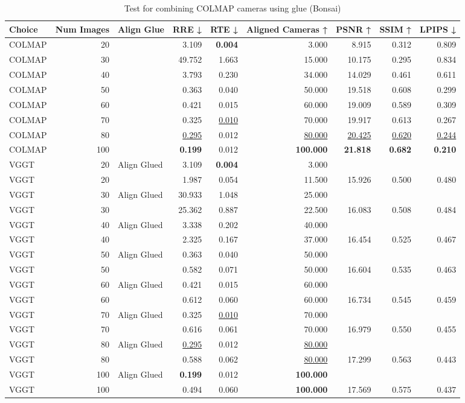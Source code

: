 \begin{table}[H]
\caption{Test for combining COLMAP cameras using glue (Bonsai)}
\label{tab:99_align_glue_bonsai}
\begin{tabular}{lrlrrrrrr}
\toprule
Choice & Num Images & Align Glue & RRE ↓ & RTE ↓ & Aligned Cameras ↑ & PSNR ↑ & SSIM ↑ & LPIPS ↓ \\
\midrule
COLMAP & 20 &  & 3.109 & \textbf{0.004} & 3.000 & 8.915 & 0.312 & 0.809 \\
COLMAP & 30 &  & 49.752 & 1.663 & 15.000 & 10.175 & 0.295 & 0.834 \\
COLMAP & 40 &  & 3.793 & 0.230 & 34.000 & 14.029 & 0.461 & 0.611 \\
COLMAP & 50 &  & 0.363 & 0.040 & 50.000 & 19.518 & 0.608 & 0.299 \\
COLMAP & 60 &  & 0.421 & 0.015 & 60.000 & 19.009 & 0.589 & 0.309 \\
COLMAP & 70 &  & 0.325 & \underline{0.010} & 70.000 & 19.917 & 0.613 & 0.267 \\
COLMAP & 80 &  & \underline{0.295} & 0.012 & \underline{80.000} & \underline{20.425} & \underline{0.620} & \underline{0.244} \\
COLMAP & 100 &  & \textbf{0.199} & 0.012 & \textbf{100.000} & \textbf{21.818} & \textbf{0.682} & \textbf{0.210} \\
VGGT & 20 & Align Glued & 3.109 & \textbf{0.004} & 3.000 &  &  &  \\
VGGT & 20 &  & 1.987 & 0.054 & 11.500 & 15.926 & 0.500 & 0.480 \\
VGGT & 30 & Align Glued & 30.933 & 1.048 & 25.000 &  &  &  \\
VGGT & 30 &  & 25.362 & 0.887 & 22.500 & 16.083 & 0.508 & 0.484 \\
VGGT & 40 & Align Glued & 3.338 & 0.202 & 40.000 &  &  &  \\
VGGT & 40 &  & 2.325 & 0.167 & 37.000 & 16.454 & 0.525 & 0.467 \\
VGGT & 50 & Align Glued & 0.363 & 0.040 & 50.000 &  &  &  \\
VGGT & 50 &  & 0.582 & 0.071 & 50.000 & 16.604 & 0.535 & 0.463 \\
VGGT & 60 & Align Glued & 0.421 & 0.015 & 60.000 &  &  &  \\
VGGT & 60 &  & 0.612 & 0.060 & 60.000 & 16.734 & 0.545 & 0.459 \\
VGGT & 70 & Align Glued & 0.325 & \underline{0.010} & 70.000 &  &  &  \\
VGGT & 70 &  & 0.616 & 0.061 & 70.000 & 16.979 & 0.550 & 0.455 \\
VGGT & 80 & Align Glued & \underline{0.295} & 0.012 & \underline{80.000} &  &  &  \\
VGGT & 80 &  & 0.588 & 0.062 & \underline{80.000} & 17.299 & 0.563 & 0.443 \\
VGGT & 100 & Align Glued & \textbf{0.199} & 0.012 & \textbf{100.000} &  &  &  \\
VGGT & 100 &  & 0.494 & 0.060 & \textbf{100.000} & 17.569 & 0.575 & 0.437 \\
\bottomrule
\end{tabular}
\end{table}
